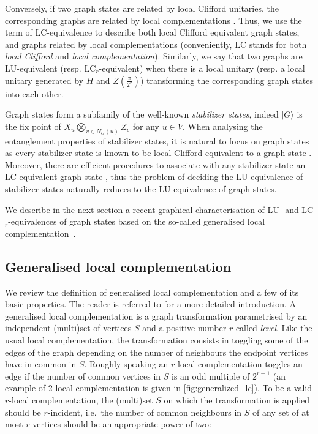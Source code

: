 \documentclass[a4paper,UKenglish,cleveref,autoref,thm-restate]{arxiv}
\newcommand{\ket}[1]{  |{#1} \rangle} \newcommand{\bra}[1]{ \left \langle#1\right | }
\begin{document}
Conversely, if two graph states are related by local Clifford unitaries, the corresponding graphs are related by local complementations \cite{VandenNest04}. Thus, we use the term of LC-equivalence to describe both local Clifford equivalent graph states, and graphs related by local complementations (conveniently, LC stands for both \emph{local Clifford} and \emph{local complementation}). Similarly, we say that two graphs are LU-equivalent (resp. LC$_r$-equivalent) when there is a local unitary (resp. a local unitary generated by $H$ and $Z(\frac \pi {2^r})$) transforming the corresponding graph states into each other. 

Graph states form a subfamily of the well-known \emph{stabilizer states}, indeed $\ket G$ is the fix point of $X_u\bigotimes_{v\in N_G(u)}Z_v$ for any $u\in V$. When analysing the entanglement properties of stabilizer states, it is natural to focus on graph states as every stabilizer state is known to be local Clifford equivalent to a graph state \cite{VandenNest04}. Moreover, there are efficient procedures to associate with any stabilizer state an LC-equivalent graph state \cite{VdnEfficientLC}, thus the problem of deciding the LU-equivalence of stabilizer states naturally reduces to the LU-equivalence of graph states. 



We describe in the next section a recent graphical characterisation of LU- and LC$_r$-equivalences of graph states based on the so-called generalised local complementation~\cite{claudet2024local}. 

\subsection{Generalised local complementation}


We review the definition of generalised local complementation and a few of its basic properties. The reader is referred to \cite{claudet2024local} for a more detailed introduction. A generalised local complementation is a graph transformation parametrised by an independent (multi)set of vertices $S$ and a positive number $r$ called \emph{level}. Like the usual local complementation, the transformation consists in toggling some of the edges of the graph depending on the number of neighbours the endpoint vertices have in common in $S$. Roughly speaking an $r$-local complementation toggles an edge if the number of common vertices in $S$ is an odd multiple of $2^{r-1}$ (an example of $2$-local complementation is given in \cref{fig:generalized_lc}). To be a valid $r$-local complementation, the (multi)set $S$ on which the transformation is applied should  be $r$-incident, i.e.~the number of common neighbours in $S$ of any set of at most $r$ vertices should be an appropriate power of two: 
\end{document}
